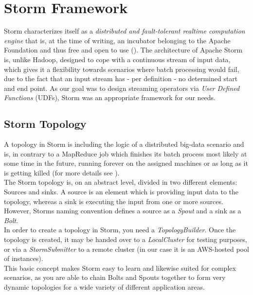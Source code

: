 \section{Storm Framework}
\label{sect:architecture}

	Storm characterizes itself as a \textit{distributed and fault-tolerant realtime computation engine} that is, at the time of writing, an incubator belonging to the Apache Foundation and thus free and open to use (\cite{Website:Storm}).
	The architecture of Apache Storm is, unlike Hadoop, designed to cope with a continuous stream of input data, which gives it a flexibility towards scenarios where batch processing would fail, due to the fact that an input stream has - per definition - no determined start and end point. As our goal was to design streaming operators via \textit{User Defined Functions} (UDFs), Storm was an appropriate framework for our needs.


\subsection{Storm Topology}
\label{sect:stormTopology}
	A topology in Storm is including the logic of a distributed big-data scenario and is, in contrary to a MapReduce job which finishes its batch process most likely at some time in the future, running forever on the assigned machines or as long as it is getting killed (for more details see \cite{Wiki:StormConcepts}). \\
	The Storm topology is, on an abstract level, divided in two different elements: Sources and sinks. A source is an element which is providing input data to the topology, whereas a sink is executing the input from one or more sources. However, Storms naming convention defines a source as a \textit{Spout} and a sink as a \textit{Bolt}.\\
	In order to create a topology in Storm, you need a \textit{TopologyBuilder}. Once the topology is created, it may be handed over to a \textit{LocalCluster} for testing purposes, or via a \textit{StormSubmitter} to a remote cluster (in our case it is an AWS-hosted pool of instances).\\
	This basic concept makes Storm easy to learn and likewise suited for complex scenarios, as you are able to chain Bolts and Spouts together to form very dynamic topologies for a wide variety of different application areas.

